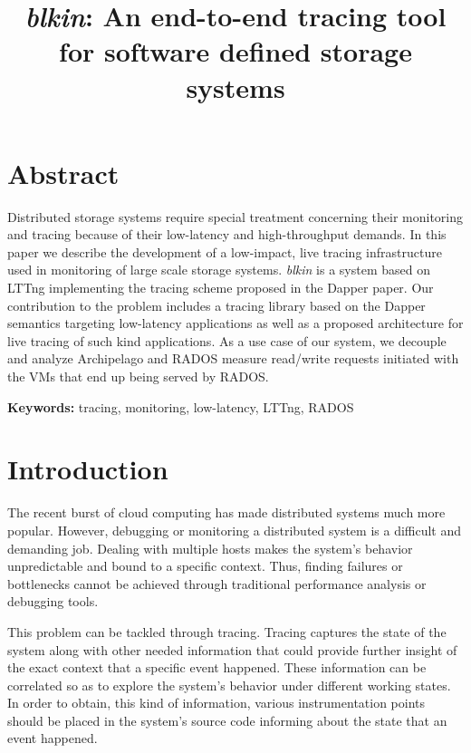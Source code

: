 \documentclass[a4paper,10pt,twocolumn]{article}
\begin{document}
\title{\emph{blkin}: An end-to-end tracing tool for software defined storage 
systems}
\date{}
\maketitle

\section*{Abstract}
Distributed storage systems require special treatment concerning their
monitoring and tracing because of their low-latency and high-throughput demands.
In this paper we describe the development of a low-impact, live tracing
infrastructure used in monitoring of large scale storage systems. \emph{blkin}
is a system based on LTTng\cite{lttng} implementing the tracing scheme proposed
in the Dapper paper\cite{dapper}. Our contribution to the problem includes a
tracing library based on the Dapper semantics targeting low-latency applications
as well as a proposed architecture for live tracing of such kind applications.
As a use case of our system, we decouple and analyze Archipelago\cite{archip}
and RADOS\cite{rados} measure read/write requests initiated with the VMs that
end up being served by RADOS.


\textbf{Keywords: } tracing, monitoring, low-latency, LTTng, RADOS

\section{Introduction}

The recent burst of cloud computing has made distributed systems much more
popular. However, debugging or monitoring a distributed system is a difficult
and demanding job. Dealing with multiple hosts makes the system's behavior
unpredictable and bound to a specific context. Thus, finding failures or
bottlenecks cannot be achieved through traditional performance analysis or
debugging tools. 

This problem can be tackled through tracing. Tracing captures the state of the
system along with other needed information that could provide further insight of
the exact context that a specific event happened. These information can be
correlated so as to explore the system's behavior under different working
states. In order to obtain, this kind of information, various instrumentation
points should be placed in the system's source code informing about the state
that an event happened.
\end{document}
